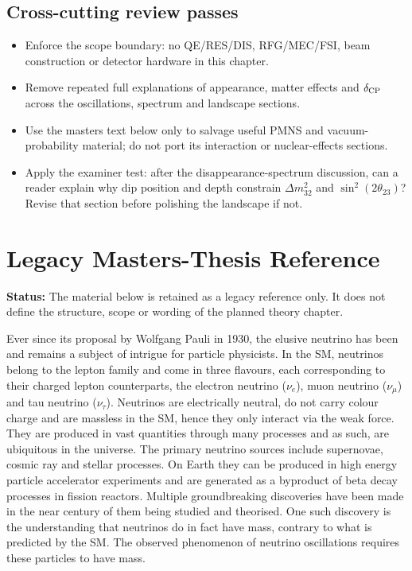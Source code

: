 \documentclass[11pt]{article}
\begin{document}
\subsection{Cross-cutting review passes}
\begin{itemize}
    \item Enforce the scope boundary: no QE/RES/DIS, RFG/MEC/FSI, beam construction or detector
    hardware in this chapter.
    \item Remove repeated full explanations of appearance, matter effects and $\delta_{\rm CP}$
    across the oscillations, spectrum and landscape sections.
    \item Use the masters text below only to salvage useful PMNS and vacuum-probability material;
    do not port its interaction or nuclear-effects sections.
    \item Apply the examiner test: after the disappearance-spectrum discussion, can a reader
    explain why dip position and depth constrain $\Delta m^{2}_{32}$ and
    $\sin^{2}(2\theta_{23})$? Revise that section before polishing the landscape if not.
\end{itemize}

\appendix
\section{Legacy Masters-Thesis Reference}

\noindent\textbf{Status:} The material below is retained as a legacy reference only. It does not
define the structure, scope or wording of the planned theory chapter.

\noindent Ever since its proposal by Wolfgang Pauli in 1930, the elusive neutrino has been and remains a subject of intrigue for particle physicists. In the SM, neutrinos belong to the lepton family and come in three flavours, each corresponding to their charged lepton counterparts, the electron neutrino ($\nu_e$), muon neutrino ($\nu_{\mu}$) and tau neutrino ($\nu_{\tau}$). Neutrinos are electrically neutral, do not carry colour charge and are massless in the SM, hence they only interact via the weak force. They are produced in vast quantities through many processes and as such, are ubiquitous in the universe. The primary neutrino sources include supernovae, cosmic ray and stellar processes. On Earth they can be produced in high energy particle accelerator experiments and are generated as a byproduct of beta decay processes in fission reactors. Multiple groundbreaking discoveries have been made in the near century of them being studied and theorised. One such discovery is the understanding that neutrinos do in fact have mass, contrary to what is predicted by the SM. The observed phenomenon of neutrino oscillations requires these particles to have mass. 
\end{document}
